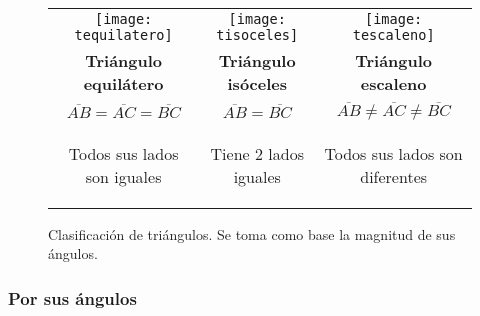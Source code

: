 \begin{figure*}[h!]
\def\arraystretch{1.5}%
\caption[Clasificación de t2]{Clasificación de triángulos. 
	Se toma como base la magnitud de sus ángulos.
}
\label{clasiftriang2}
\begin{tabular}{c  c  c }
	\texttt{[image: tequilatero]} & 
	\texttt{[image: tisoceles]}  & 
	\texttt{[image: tescaleno]} 
	\\ %

	\textbf{Triángulo equilátero} & 
	\textbf{Triángulo isóceles} & 
	\textbf{Triángulo escaleno}                       
	\\ %

	$\overline{AB} = \overline{AC} = \overline{BC}$ &
	$\overline{AB} = \overline{BC}$ &
	$\overline{AB} \ne \overline{AC} \ne \overline{BC}$ 
	\\

	\parbox{4cm}{
		\begin{center}
			Todos sus lados son iguales
		\end{center} 
	} & 
	\parbox{4cm}{
		\begin{center}
			Tiene 2 lados iguales
		\end{center} 
	} & 
	\parbox{4cm}{
		\begin{center}
			Todos sus lados son diferentes
		\end{center} 
	}                                 
\end{tabular}
\end{figure*}

\subsubsection{Por sus ángulos}

